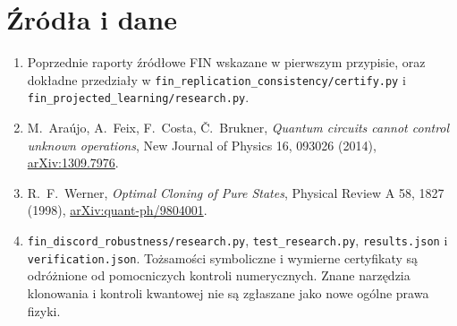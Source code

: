 \documentclass[11pt,a4paper]{article}
\begin{document}
\section*{Źródła i dane}
\begin{enumerate}
\item Poprzednie raporty źródłowe FIN wskazane w pierwszym przypisie,
oraz dokładne przedziały w
\texttt{fin\_replication\_consistency/certify.py} i
\texttt{fin\_projected\_learning/research.py}.
\item M.~Araújo, A.~Feix, F.~Costa, Č.~Brukner,
\emph{Quantum circuits cannot control unknown operations},
New Journal of Physics 16, 093026 (2014),
\href{https://arxiv.org/abs/1309.7976}{arXiv:1309.7976}.
\item R.~F.~Werner, \emph{Optimal Cloning of Pure States},
Physical Review A 58, 1827 (1998),
\href{https://arxiv.org/abs/quant-ph/9804001}{arXiv:quant-ph/9804001}.
\item \texttt{fin\_discord\_robustness/research.py},
\texttt{test\_research.py}, \texttt{results.json} i
\texttt{verification.json}. Tożsamości symboliczne i wymierne
certyfikaty są odróżnione od pomocniczych kontroli numerycznych.
Znane narzędzia klonowania i kontroli kwantowej nie są zgłaszane
jako nowe ogólne prawa fizyki.
\end{enumerate}
\end{document}

